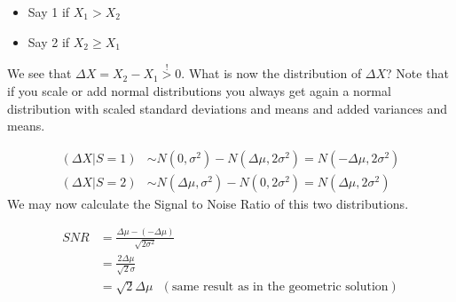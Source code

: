 \documentclass[../main/Notes.tex]{subfiles}
\begin{document}
\begin{itemize}
  \item Say 1 if $X_{1} > X_{2}$
  \item Say 2 if $X_{2} \geq X_{1}$
\end{itemize}


We see that $\Delta X= X_{2}-X_{1} \stackrel{!}{>}0$. What is now the distribution of $\Delta X$? Note that if you scale or add normal distributions you always get again a normal distribution with scaled standard deviations and means and added variances and means.

\begin{align*}
\left(\Delta X | S = 1\right) &\sim N\left(0, \sigma^{2}\right) - N\left( \Delta \mu , 2\sigma^{2}\right) = N\left( -\Delta \mu , 2\sigma^{2}\right)\\
\left(\Delta X | S = 2\right) &\sim N\left(\Delta \mu, \sigma^{2}\right) - N\left(0, 2\sigma^{2}\right) = N \left( \Delta \mu , 2\sigma^{2}\right)
\end{align*}
We may now calculate the Signal to Noise Ratio of this two distributions.

\begin{center}
  \begin{minipage}[b][3cm][t]{3.5cm}
  \end{minipage}
  \begin{minipage}[b][3cm][t]{12cm}
    \begin{align*}
      SNR &= \frac{\Delta\mu - (-\Delta\mu)}{\sqrt{2\sigma^2}}\\
          &= \frac{2\Delta\mu}{\sqrt{2}\sigma}\\
          &= \sqrt{2}\Delta\mu ~~~\left(\text{same result as in the geometric solution}\right)
    \end{align*}
  \end{minipage}
\end{center}
\end{document}
